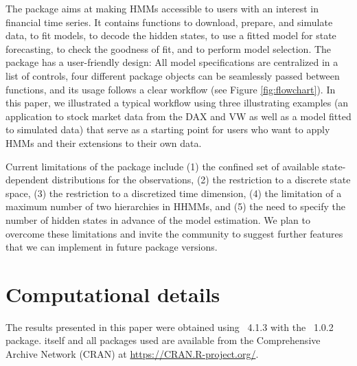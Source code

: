 \documentclass[article]{jss}
\begin{document}
The  package aims at making HMMs accessible to  users with an interest in financial time series. It contains functions to download, prepare, and simulate data, to fit models, to decode the hidden states, to use a fitted model for state forecasting, to check the goodness of fit, and to perform model selection. The  package has a user-friendly design: All model specifications are centralized in a list of controls, four different package objects can be seamlessly passed between functions, and its usage follows a clear workflow (see Figure \ref{fig:flowchart}). In this paper, we illustrated a typical workflow using three illustrating examples (an application to stock market data from the DAX and VW as well as a model fitted to simulated data) that serve as a starting point for  users who want to apply HMMs and their extensions to their own data.

Current limitations of the  package include (1) the confined set of available state-dependent distributions for the observations, (2) the restriction to a discrete state space, (3) the restriction to a discretized time dimension, (4) the limitation of a maximum number of two hierarchies in HHMMs, and (5) the need to specify the number of hidden states in advance of the model estimation. We plan to overcome these limitations and invite the community to suggest further features that we can implement in future package versions.


\section*{Computational details}

The results presented in this paper were obtained using
~4.1.3 with the
~1.0.2 package.  itself
and all packages used are available from the Comprehensive
 Archive Network (CRAN) at \url{https://CRAN.R-project.org/}.



\end{document}
